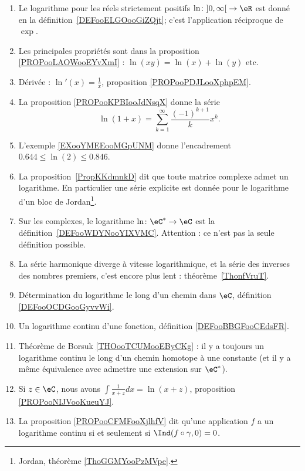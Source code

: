 
	\label{THEMEooLogarithme}
\begin{enumerate}
	\item
	      Le logarithme pour les réels strictement positifs \( \ln\colon \mathopen] 0 , \infty \mathclose[\to \eR\) est donné en la définition~\ref{DEFooELGOooGiZQjt}; c'est l'application réciproque de \( \exp\).
	\item
	      Les principales propriétés sont dans la proposition \ref{PROPooLAOWooEYvXmI} : \( \ln(xy)=\ln(x)+\ln(y)\) etc.
	\item
	      Dérivée : \( \ln'(x)=\frac{1}{ x }\), proposition \ref{PROPooPDJLooXphpEM}.
	\item
	      La proposition \ref{PROPooKPBIooJdNsqX} donne la série
	      \begin{equation}
		      \ln(1+x)=\sum_{k=1}^{\infty}\frac{ (-1)^{k+1} }{ k }x^k.
	      \end{equation}
	\item
	      L'exemple \ref{EXooYMEEooMGpUNM} donne l'encadrement \( 0.644\leq \ln(2)\leq 0.846\).
	\item
	      La proposition~\ref{PropKKdmnkD} dit que toute matrice complexe admet un logarithme. En particulier une série explicite est donnée pour le logarithme d'un bloc de Jordan\footnote{Jordan, théorème \ref{ThoGGMYooPzMVpe}.}.
	\item
	      Sur les complexes, le logarithme \( \ln \colon \eC^*\to \eC\) est la définition~\ref{DEFooWDYNooYIXVMC}. Attention : ce n'est pas la seule définition possible.
	\item
	      La série harmonique diverge à vitesse logarithmique, et la série des inverses des nombres premiers, c'est encore plus lent : théorème~\ref{ThonfVruT}.
      \item
          Détermination du logarithme le long d'un chemin dans \( \eC\), définition \ref{DEFooOCDGooGyvvWi}.
      \item
          Un logarithme continu d'une fonction, définition \ref{DEFooBBGFooCEdsFR}.
      \item
          Théorème de Borsuk \ref{THOooTCUMooEByCKg} : il y a toujours un logarithme continu le long d'un chemin homotope à une constante (et il y a même équivalence avec admettre une extension sur \( \eC^*\)).
      \item
          Si \( z\in \eC\), nous avons $\int\frac{1}{ x+z }dx=\ln(x+z)$, proposition \ref{PROPooNIJVooKueuYJ}.
      \item
          La proposition \ref{PROPooCFMFooXjlhfV} dit qu'une application \( f\) a un logarithme continu si et seulement si \( \Ind(f\circ\gamma,0)=0\).
\end{enumerate}

